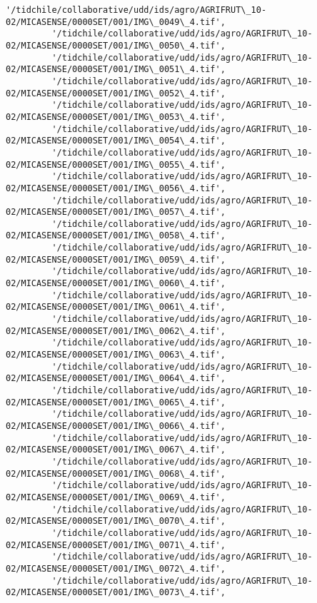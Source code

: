 \documentclass[11pt]{article}
\begin{document}
\begin{Verbatim}[commandchars=\\\{\}]
         '/tidchile/collaborative/udd/ids/agro/AGRIFRUT\_10-02/MICASENSE/0000SET/001/IMG\_0049\_4.tif',
         '/tidchile/collaborative/udd/ids/agro/AGRIFRUT\_10-02/MICASENSE/0000SET/001/IMG\_0050\_4.tif',
         '/tidchile/collaborative/udd/ids/agro/AGRIFRUT\_10-02/MICASENSE/0000SET/001/IMG\_0051\_4.tif',
         '/tidchile/collaborative/udd/ids/agro/AGRIFRUT\_10-02/MICASENSE/0000SET/001/IMG\_0052\_4.tif',
         '/tidchile/collaborative/udd/ids/agro/AGRIFRUT\_10-02/MICASENSE/0000SET/001/IMG\_0053\_4.tif',
         '/tidchile/collaborative/udd/ids/agro/AGRIFRUT\_10-02/MICASENSE/0000SET/001/IMG\_0054\_4.tif',
         '/tidchile/collaborative/udd/ids/agro/AGRIFRUT\_10-02/MICASENSE/0000SET/001/IMG\_0055\_4.tif',
         '/tidchile/collaborative/udd/ids/agro/AGRIFRUT\_10-02/MICASENSE/0000SET/001/IMG\_0056\_4.tif',
         '/tidchile/collaborative/udd/ids/agro/AGRIFRUT\_10-02/MICASENSE/0000SET/001/IMG\_0057\_4.tif',
         '/tidchile/collaborative/udd/ids/agro/AGRIFRUT\_10-02/MICASENSE/0000SET/001/IMG\_0058\_4.tif',
         '/tidchile/collaborative/udd/ids/agro/AGRIFRUT\_10-02/MICASENSE/0000SET/001/IMG\_0059\_4.tif',
         '/tidchile/collaborative/udd/ids/agro/AGRIFRUT\_10-02/MICASENSE/0000SET/001/IMG\_0060\_4.tif',
         '/tidchile/collaborative/udd/ids/agro/AGRIFRUT\_10-02/MICASENSE/0000SET/001/IMG\_0061\_4.tif',
         '/tidchile/collaborative/udd/ids/agro/AGRIFRUT\_10-02/MICASENSE/0000SET/001/IMG\_0062\_4.tif',
         '/tidchile/collaborative/udd/ids/agro/AGRIFRUT\_10-02/MICASENSE/0000SET/001/IMG\_0063\_4.tif',
         '/tidchile/collaborative/udd/ids/agro/AGRIFRUT\_10-02/MICASENSE/0000SET/001/IMG\_0064\_4.tif',
         '/tidchile/collaborative/udd/ids/agro/AGRIFRUT\_10-02/MICASENSE/0000SET/001/IMG\_0065\_4.tif',
         '/tidchile/collaborative/udd/ids/agro/AGRIFRUT\_10-02/MICASENSE/0000SET/001/IMG\_0066\_4.tif',
         '/tidchile/collaborative/udd/ids/agro/AGRIFRUT\_10-02/MICASENSE/0000SET/001/IMG\_0067\_4.tif',
         '/tidchile/collaborative/udd/ids/agro/AGRIFRUT\_10-02/MICASENSE/0000SET/001/IMG\_0068\_4.tif',
         '/tidchile/collaborative/udd/ids/agro/AGRIFRUT\_10-02/MICASENSE/0000SET/001/IMG\_0069\_4.tif',
         '/tidchile/collaborative/udd/ids/agro/AGRIFRUT\_10-02/MICASENSE/0000SET/001/IMG\_0070\_4.tif',
         '/tidchile/collaborative/udd/ids/agro/AGRIFRUT\_10-02/MICASENSE/0000SET/001/IMG\_0071\_4.tif',
         '/tidchile/collaborative/udd/ids/agro/AGRIFRUT\_10-02/MICASENSE/0000SET/001/IMG\_0072\_4.tif',
         '/tidchile/collaborative/udd/ids/agro/AGRIFRUT\_10-02/MICASENSE/0000SET/001/IMG\_0073\_4.tif',

\end{Verbatim}
\end{document}
